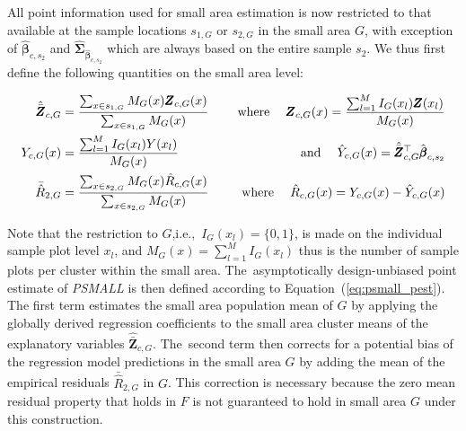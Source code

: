 \documentclass[remotesensing,article,accept,moreauthors,pdftex,10pt,a4paper]{Definitions/mdpi}
\begin{document}
All point information used for small area estimation is now restricted to that available at the sample locations $s_{1,G}$ or $s_{2,G}$ in the small area $G$, with exception of $\hat{\pmb{\beta}}_{c,s_2}$ and $\hat{\pmb{\Sigma}}_{\hat{\pmb{\beta}}_{c,s_2}}$ which are always based on the entire sample $s_2$. We thus first define the following quantities on the small area level:

\begin{subequations}\label{eq:compsG}
	\begin{align}
	\hat{\bar{\pmb{Z}}}_{c,G} & =  \frac{\sum_{x \in s_{1,G}} M_{G}(x) \pmb{Z}_{c,G}(x)}{\sum_{x \in s_{1,G}} M_{G}(x)} \label{eq:meanZcG} \hspace{3ex} &\text{where} \hspace{3ex}
	\pmb{Z}_{c,G}(x)  =   \frac{\sum_{l = 1}^{M} I_{G}(x_l)\pmb{Z}(x_l)}{M_{G}(x)}\\		
	Y_{c,G}(x) & =  \frac{\sum_{l = 1}^{M} I_{G}(x_l)Y(x_l)}{M_{G}(x)}  &\text{and} \hspace{3ex}
	\hat{Y}_{c,G}(x) = \hat{\bar{\pmb{Z}}}_{c,G}^{\top}\hat{\pmb{\beta}}_{c,s_2}\\
	\bar{\hat{R}}_{2,G} & =  \frac{\sum_{x \in s_{2,G}} M_{G}(x) \hat{R}_{c,G}(x)}{\sum_{x \in s_{2,G}} M_{G}(x)} \hspace{3ex} &\text{where} \hspace{3ex}
	\hat{R}_{c,G}(x)  =  Y_{c,G}(x)-\hat{Y}_{c,G}(x)
	\end{align}
\end{subequations}

Note that the restriction to $G$,i.e.,~$I_{G}(x_l) = \{0,1\}$, is made on the individual sample plot level $x_l$, and $M_{G}(x)  =  \sum_{l = 1}^{M}I_{G}(x_l)$ thus is the number of sample plots per cluster within the small area. The~asymptotically design-unbiased point estimate of \textit{PSMALL} is then defined according to Equation~(\ref{eq:psmall_pest}). The first term estimates the small area population mean of $G$ by applying the globally derived regression coefficients to the small area cluster means of the explanatory variables $\hat{\bar{\pmb{Z}}}_{c,G}$. The~second term then corrects for a potential bias of the regression model predictions in the small area $G$ by adding the mean of the empirical residuals $\bar{\hat{R}}_{2,G}$ in $G$. This correction is necessary because the zero mean residual property that holds in $F$ is not guaranteed to hold in small area $G$ under this construction.
	
\end{document}
